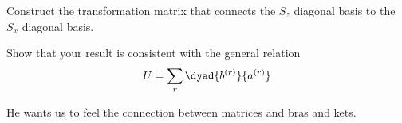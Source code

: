 \begin{question}

  \begin{questionpart}
    Construct the transformation matrix that connects the $S_z$
    diagonal basis to the $S_x$ diagonal basis.
  \end{questionpart}

  \begin{questionpart}
    Show that your result is consistent with the general relation
    \begin{equation*}
      U = \sum_r \dyad{b^{(r)}}{a^{(r)}}
    \end{equation*}
  \end{questionpart}

\end{question}

\begin{purpose}
  He wants us to feel the connection between matrices and bras and
  kets.
\end{purpose}

